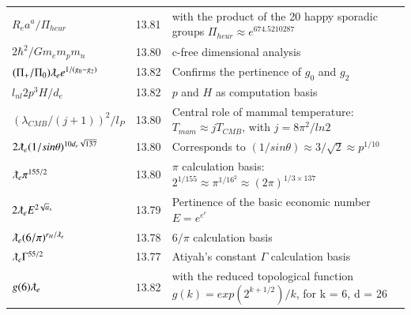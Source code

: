 \documentclass[a4paper,9pt]{article}
\begin{document}
\begin{table}
\begin{tabular}{lll}
  
  
  
  
  
  
 
 $R_e a^a/\Pi_{heur}$  & 13.81    & with the product of the 20 happy sporadic groups $\Pi_{heur}\approx e^{674.5210287}$  \\
 


$ 2\hbar^2/Gm_em_pm_n $ & 13.80 & c-free dimensional analysis \cite{Sanchez4}  \\
 
 $(\Pi_+/\Pi_0) \lambdabar_{e} e^{1/(g_0-g_2)}$ & 13.82 & Confirms the pertinence of $g_0$ and $g_2$  \\
 
 $l_{nl}2p^3H/d_e $ & 13.82 & $p$ and $H$ as computation basis  \\

 $ (\lambda_{CMB}/(j+1))^2/l_P$ & 13.80 & Central role of mammal temperature: $T_{mam}\approx j T_{CMB}$, with $j = 8\pi^2/ln2$ \\
 
  $ 2 \lambdabar_{e} (1/sin\theta)^{10d_e\sqrt {137}} $ & 13.80 & Corresponds to $(1/sin\theta) \approx 3/\sqrt2 \approx p^{1/10}$   \\
  
  $ \lambdabar_{e} \pi^{155/2}$ & 13.80 & $\pi$ calculation basis: $2^{1/155} \approx \pi^{1/16^2}  \approx (2\pi)^{1/3\times 137} $  \\
  
  $ 2\lambdabar_{e} E^{2\sqrt a_s}$ & 13.79 & Pertinence of the basic economic number $E = e^{e^e}$  \\
  
  
  $ \lambdabar_{e} (6/\pi)^{r_H/\lambdabar_e}$ & 13.78 & $6/\pi$ calculation basis   \\  
  
  
  
$ \lambdabar_{e} \Gamma^{55/2}$ & 13.77 & Atiyah's constant $\Gamma$ calculation basis   \\  
  
  
 
 
 
 
 $ g(6) \lambdabar_{e} $ & 13.82 & with the reduced topological function $g(k) = exp(2^{k+1/2})/k$, for k = 6, d = 26  \\
 

\end{tabular}
\end{table}
\end{document}
